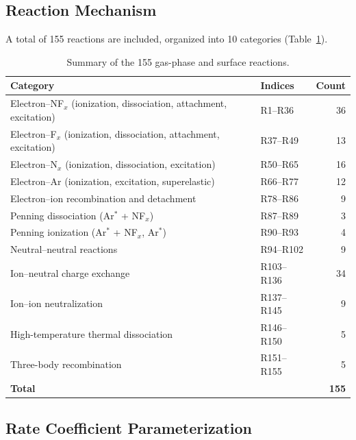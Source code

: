 \documentclass[11pt,a4paper]{article}
\begin{document}
\subsection{Reaction Mechanism}

A total of 155 reactions are included, organized into 10 categories
(Table~\ref{tab:reactions_summary}).

\begin{table}[H]
  \centering
  \caption{Summary of the 155 gas-phase and surface reactions.}
  \label{tab:reactions_summary}
  \begin{tabular}{llr}
    \toprule
    \textbf{Category} & \textbf{Indices} & \textbf{Count} \\
    \midrule
    Electron--NF$_x$ (ionization, dissociation, attachment, excitation)
      & R1--R36 & 36 \\
    Electron--F$_x$ (ionization, dissociation, attachment, excitation)
      & R37--R49 & 13 \\
    Electron--N$_x$ (ionization, dissociation, excitation)
      & R50--R65 & 16 \\
    Electron--Ar (ionization, excitation, superelastic)
      & R66--R77 & 12 \\
    Electron--ion recombination and detachment
      & R78--R86 & 9 \\
    Penning dissociation (Ar$^*$ + NF$_x$)
      & R87--R89 & 3 \\
    Penning ionization (Ar$^*$ + NF$_x$, Ar$^*$)
      & R90--R93 & 4 \\
    Neutral--neutral reactions
      & R94--R102 & 9 \\
    Ion--neutral charge exchange
      & R103--R136 & 34 \\
    Ion--ion neutralization
      & R137--R145 & 9 \\
    High-temperature thermal dissociation
      & R146--R150 & 5 \\
    Three-body recombination
      & R151--R155 & 5 \\
    \midrule
    \textbf{Total} & & \textbf{155} \\
    \bottomrule
  \end{tabular}
\end{table}


\subsection{Rate Coefficient Parameterization}
\label{sec:rate_coeff}
\end{document}
